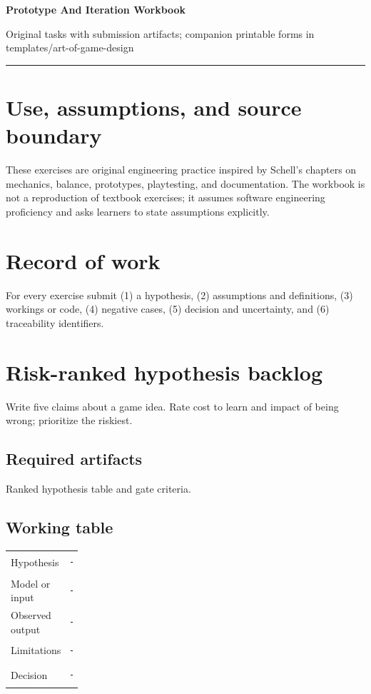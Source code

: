 \documentclass[11pt]{article}
\begin{document}
{\huge\bfseries\color{suiteblue} Prototype And Iteration Workbook}\par
\vspace{0.15in}
{\normalsize\color{suitegray} Original tasks with submission artifacts; companion printable forms in templates/art-of-game-design}\par
\vspace{0.15in}\hrule\vspace{0.15in}

\section{Use, assumptions, and source boundary}
These exercises are original engineering practice inspired by Schell's chapters on mechanics, balance, prototypes, playtesting, and documentation. The workbook is not a reproduction of textbook exercises; it assumes software engineering proficiency and asks learners to state assumptions explicitly.


\section{Record of work}
For every exercise submit (1) a hypothesis, (2) assumptions and definitions, (3) workings or code, (4) negative cases, (5) decision and uncertainty, and (6) traceability identifiers.


\section{Risk-ranked hypothesis backlog}
Write five claims about a game idea. Rate cost to learn and impact of being wrong; prioritize the riskiest.


\subsection{Required artifacts}
Ranked hypothesis table and gate criteria.


\subsection{Working table}
\begin{tabularx}{\linewidth}{@{}p{0.20\linewidth}X@{}}\toprule
Hypothesis & \rule{0.90\linewidth}{0.4pt}\\[0.35cm]
Model or input & \rule{0.90\linewidth}{0.4pt}\\[0.35cm]
Observed output & \rule{0.90\linewidth}{0.4pt}\\[0.35cm]
Limitations & \rule{0.90\linewidth}{0.4pt}\\[0.35cm]
Decision & \rule{0.90\linewidth}{0.4pt}\\\bottomrule\end{tabularx}
\end{document}
